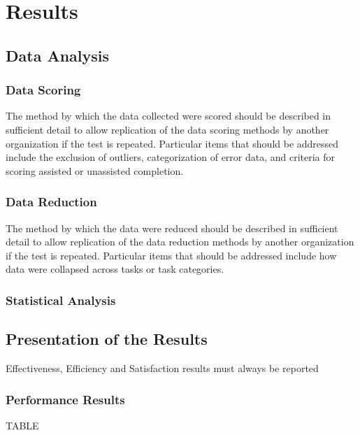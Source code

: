 \documentclass[a4paper]{article}
\begin{document}
 
 \section{Results}
 \subsection{Data Analysis}
 \subsubsection{Data Scoring}
 The method by which the data collected were scored should be described in sufficient detail to allow replication of the data scoring methods by another organization if the test is repeated. Particular items that should be addressed include the exclusion of outliers, categorization of error data, and criteria for scoring assisted or unassisted completion.
  \subsubsection{Data Reduction}
  The method by which the data were reduced should be described in sufficient detail to allow replication of the data reduction methods by another organization if the test is repeated. Particular items that should be addressed include how data were collapsed across tasks or task categories.
   \subsubsection{Statistical Analysis}
   
   \subsection{Presentation of the Results}
   Effectiveness, Efficiency and Satisfaction results must always be reported

\subsubsection{Performance Results}
TABLE

\appendix






\end{document}

